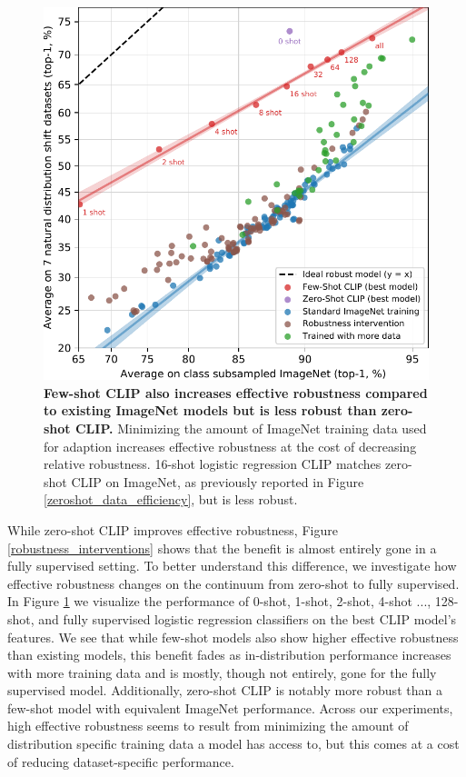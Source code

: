 \documentclass{article}
\begin{document}
\begin{figure}[t]
\begin{center}
\centerline{\includegraphics[width=1.0\columnwidth]{fs-clip-vs-imagenet-robustness-plot.pdf}}
\caption{\textbf{Few-shot CLIP also increases effective robustness compared to existing ImageNet models but is less robust than zero-shot CLIP.} Minimizing the amount of ImageNet training data used for adaption increases effective robustness at the cost of decreasing relative robustness. 16-shot logistic regression CLIP matches zero-shot CLIP on ImageNet, as previously reported in Figure \ref{zeroshot_data_efficiency}, but is less robust.}
\label{few_shot_robustness}
\end{center}
\end{figure}


While zero-shot CLIP improves effective robustness, Figure \ref{robustness_interventions} shows that the benefit is almost entirely gone in a fully supervised setting. To better understand this difference, we investigate how effective robustness changes on the continuum from zero-shot to fully supervised. In Figure \ref{few_shot_robustness} we visualize the performance of 0-shot, 1-shot, 2-shot, 4-shot ..., 128-shot, and fully supervised logistic regression classifiers on the best CLIP model's features. We see that while few-shot models also show higher effective robustness than existing models, this benefit fades as in-distribution performance increases with more training data and is mostly, though not entirely, gone for the fully supervised model. Additionally, zero-shot CLIP is notably more robust than a few-shot model with equivalent ImageNet performance. Across our experiments, high effective robustness seems to result from minimizing the amount of distribution specific training data a model has access to, but this comes at a cost of reducing dataset-specific performance. 
\end{document}
